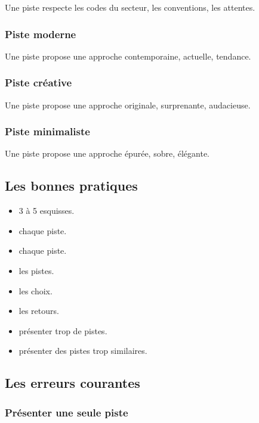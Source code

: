 Une piste  respecte les codes du secteur, les conventions, les attentes.

\subsubsection{Piste moderne}

Une piste  propose une approche contemporaine, actuelle, tendance.

\subsubsection{Piste créative}

Une piste  propose une approche originale, surprenante, audacieuse.

\subsubsection{Piste minimaliste}

Une piste  propose une approche épurée, sobre, élégante.

\subsection{Les bonnes pratiques}

\begin{itemize}
    \item {} 3 à 5 esquisses.
    \item {} chaque piste.
    \item {} chaque piste.
    \item {} les pistes.
    \item {} les choix.
    \item {} les retours.
    \item {} présenter trop de pistes.
    \item {} présenter des pistes trop similaires.
\end{itemize}

\subsection{Les erreurs courantes}

\subsubsection{Présenter une seule piste}


